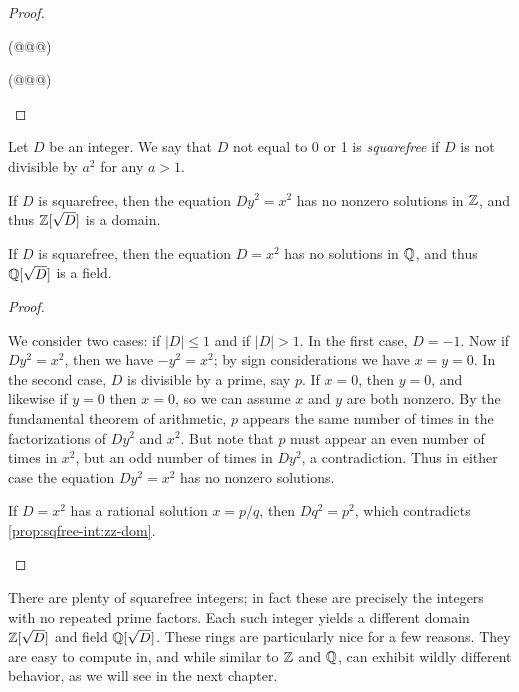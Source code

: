 \begin{proof}
\begin{inlineproplist}
\item (@@@)
\item (@@@)
\end{inlineproplist}
\end{proof}

\begin{prop} \label{prop:sqfree-int}
Let \(D\) be an integer. We say that \(D\) not equal to 0 or 1 is \emph{squarefree}  if \(D\) is not divisible by \(a^2\) for any \(a > 1\).
\begin{proplist}
\item If \(D\) is squarefree, then the equation \(Dy^2 = x^2\) has no nonzero solutions in \(\mathbb{Z}\), and thus \(\mathbb{Z}[\sqrt{D}]\) is a domain. \label{prop:sqfree-int:zz-dom}
\item If \(D\) is squarefree, then the equation \(D = x^2\) has no solutions in \(\mathbb{Q}\), and thus \(\mathbb{Q}[\sqrt{D}]\) is a field. \label{prop:sqfree-int:qq-field}
\end{proplist}
\end{prop}

\begin{proof}
\begin{inlineproplist}
\item We consider two cases: if \(|D| \leq 1\) and if \(|D| > 1\). In the first case, \(D = -1\). Now if \(Dy^2 = x^2\), then we have \(-y^2 = x^2\); by sign considerations we have \(x = y = 0\). In the second case, \(D\) is divisible by a prime, say \(p\). If \(x = 0\), then \(y = 0\), and likewise if \(y = 0\) then \(x = 0\), so we can assume \(x\) and \(y\) are both nonzero. By the fundamental theorem of arithmetic, \(p\) appears the same number of times in the factorizations of \(Dy^2\) and \(x^2\). But note that \(p\) must appear an even number of times in \(x^2\), but an odd number of times in \(Dy^2\), a contradiction. Thus in either case the equation \(Dy^2 = x^2\) has no nonzero solutions.
\item If \(D = x^2\) has a rational solution \(x = p/q\), then \(Dq^2 = p^2\), which contradicts \ref{prop:sqfree-int:zz-dom}.
\end{inlineproplist}
\end{proof}

There are plenty of squarefree integers; in fact these are precisely the integers with no repeated prime factors. Each such integer yields a different domain \(\mathbb{Z}[\sqrt{D}]\) and field \(\mathbb{Q}[\sqrt{D}]\). These rings are particularly nice for a few reasons. They are easy to compute in, and while similar to \(\mathbb{Z}\) and \(\mathbb{Q}\), can exhibit wildly different behavior, as we will see in the next chapter.




